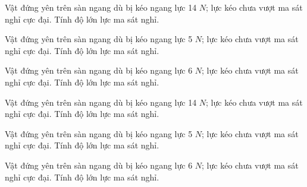 \begin{ex}
Vật đứng yên trên sàn ngang dù bị kéo ngang lực 14 $N$; lực kéo chưa vượt ma sát nghỉ cực đại. Tính độ lớn lực ma sát nghỉ.
\end{ex}

\begin{ex}
Vật đứng yên trên sàn ngang dù bị kéo ngang lực 5 $N$; lực kéo chưa vượt ma sát nghỉ cực đại. Tính độ lớn lực ma sát nghỉ.
\end{ex}

\begin{ex}
Vật đứng yên trên sàn ngang dù bị kéo ngang lực 6 $N$; lực kéo chưa vượt ma sát nghỉ cực đại. Tính độ lớn lực ma sát nghỉ.
\end{ex}

\begin{bt}
Vật đứng yên trên sàn ngang dù bị kéo ngang lực 14 $N$; lực kéo chưa vượt ma sát nghỉ cực đại. Tính độ lớn lực ma sát nghỉ.
\end{bt}

\begin{bt}
Vật đứng yên trên sàn ngang dù bị kéo ngang lực 5 $N$; lực kéo chưa vượt ma sát nghỉ cực đại. Tính độ lớn lực ma sát nghỉ.
\end{bt}

\begin{bt}
Vật đứng yên trên sàn ngang dù bị kéo ngang lực 6 $N$; lực kéo chưa vượt ma sát nghỉ cực đại. Tính độ lớn lực ma sát nghỉ.
\end{bt}

